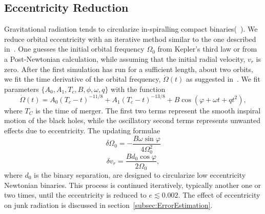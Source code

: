 \subsection{Eccentricity Reduction}
Gravitational radiation tends to circularize in-spiralling compact
binaries(~\cite{PetersMathews1963,Peters1964}). We reduce orbital
eccentricity with an iterative method similar to the one described in~\cite{Boyle2007,Chu2009}. One guesses the initial orbital
frequency $\Omega_0$ from Kepler's third law or from a Post-Newtonian
calculation, while assuming that the initial radial velocity, $v_r$ is
zero. After the first simulation has run for a sufficient length, about two orbits, we fit the time derivative of
the orbital frequency, $\dot{\Omega}(t)$ as suggested
in~\cite{Buonanno:2010yk}.  We fit parameters $\{A_0, A_1, T_c, B, \phi, \omega, q\}$ with the function
\begin{equation}
\dot{\Omega}(t)=A_0\left(T_c-t\right)^{-11/8}+A_1\left(T_c-t\right)^{-13/8}
+B\cos\left(\varphi + \omega
  t+qt^2\right),
\end{equation}
where $T_C$ is the time of merger. The first two terms represent the
smooth inspiral motion of the black holes, while the oscillatory
second terms represents unwanted effects due to eccentricity. The
updating formulae
\begin{equation}
\delta\Omega_0=-\frac{B\omega\sin{\varphi}}{4\Omega_0^2}
\end{equation}
\begin{equation}
\delta v_r = \frac{B d_0\cos{\varphi}}{2\Omega_0},
\end{equation}
where $d_0$ is the binary separation, are designed to circularize low eccentricity Newtonian binaries. This
process is continued iteratively, typically another one or two times,
until the eccentricity is reduced to $e\lesssim 0.002$. The effect of
eccentricity on junk radiation is discussed in section~\ref{subsec:ErrorEstimation}.

%

